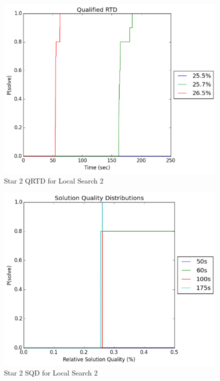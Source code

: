 \documentclass{sig-alternate-05-2015}
\begin{document}
\begin{figure}
\centering
\caption{Star 2 QRTD for Local Search 2}
\includegraphics[scale=0.4]{Star2LS2_qrtd_graph.png}
\end{figure}

\begin{figure}
\centering
\caption{Star 2 SQD for Local Search 2}
\includegraphics[scale=0.4]{Star2LS2_sqd_graph.png}
\end{figure}
\end{document}
